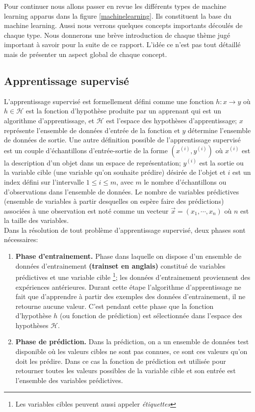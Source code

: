 \documentclass[12pt, french]{report}
\begin{document}
Pour continuer nous allons passer en revue les différents types de machine learning apparus dans la figure \ref{machinelearning}. Ils constituent la base du machine learning. Aussi nous verrons quelques concepts importants découlés de chaque type. Nous donnerons une brève introduction de chaque thème jugé important à savoir pour la suite de ce rapport. L'idée ce n'est pas tout détaillé mais de présenter un aspect global de chaque concept.  

\subsection{Apprentissage supervisé}

L'apprentissage supervisé est formellement défini comme une fonction $h:x \rightarrow y $ où $h \in \mathcal{H} $ est la fonction d'hypothèse produite par un apprenant qui est un algorithme d'apprentissage, et $\mathcal{H}$ est l'espace des hypothèses d'apprentissage; $x$ représente l'ensemble de données d'entrée de la fonction et $y$ détermine l'ensemble de données de sortie. Une autre définition possible de l'apprentissage supervisé est un couple d'échantillons d'entrée-sortie de la forme $(x^{(i)}, y^{(i)})$ où $x^{(i)}$ est la description d'un objet dans un espace de représentation; $y^{(i)}$ est la sortie ou la variable cible (une variable qu'on souhaite prédire) désirée de l'objet et $i$ est un index  défini sur l'intervalle  $1 \leq i \leq m$, avec $m$ le nombre d'échantillons ou d'observations dans l'ensemble de données. Le nombre de variables prédictives (ensemble de variables à partir desquelles on espère faire des prédictions) associées à une observation est noté comme un vecteur $\vec{x}=(x_1, \cdots, x_n)$ où $n$ est la taille des variables. \cite{key38, key40, key39}   \\

Dans la résolution de tout problème d'apprentissage supervisé, deux phases sont nécessaires:
\begin{enumerate}
	\item \textbf{Phase d'entrainement.} Phase dans laquelle on dispose d'un ensemble de données d'entrainement \textbf{(trainset en anglais)} constitué de variables prédictives et une variable cible \footnote{Les variables cibles peuvent aussi appeler \textit{étiquettes}}; les données d'entrainement proviennent des expériences antérieures. Durant cette étape l'algorithme d'apprentissage ne fait que d'apprendre à partir des exemples des données d'entrainement, il ne retourne aucune valeur. C'est pendant cette phase que la fonction d'hypothèse $h$ (ou fonction de prédiction) est sélectionnée dans l'espace des hypothèses $\mathcal{H}$. 
	\item \textbf{Phase de prédiction.} Dans la prédiction, on a un ensemble de données test disponible où les valeurs cibles ne sont pas connues, ce sont ces valeurs qu'on doit les prédire. Dans ce cas la fonction de prédiction est utilisée pour retourner toutes les valeurs possibles de la variable cible et son entrée est l'ensemble des variables prédictives.
\end{enumerate}
\end{document}
